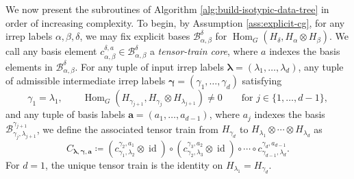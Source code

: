 \documentclass[11pt]{article}
\newcommand{\scB}{\mathcal{B}}
\newcommand{\HomG}[2]{\operatorname{Hom}_G\!\left(#1,#2\right)}
\newcommand{\id}{\operatorname{id}}
\newcommand{\set}[1]{\{#1\}}
\theoremstyle{definition}
\begin{document}
We now present the subroutines of Algorithm \ref{alg:build-isotypic-data-tree} in order of increasing complexity.
To begin, by Assumption \ref{ass:explicit-cg}, for any irrep labels $\alpha,\beta,\delta$, we may fix explicit bases $\scB_{\alpha,\beta}^{\delta}$ for $\HomG{H_\delta}{H_\alpha\otimes H_\beta}$.
We call any basis element $c_{\alpha,\beta}^{\delta,a}\in\scB_{\alpha,\beta}^{\delta}$ a \emph{tensor-train core}, where $a$ indexes the basis elements in $\scB_{\alpha,\beta}^{\delta}$.
For any tuple of input irrep labels $\boldsymbol{\lambda}=(\lambda_1,\dots,\lambda_d)$, any tuple of admissible intermediate irrep labels $\boldsymbol{\gamma}=(\gamma_1,\dots,\gamma_d)$ satisfying
\[
  \gamma_1=\lambda_1,
  \qquad
  \HomG{H_{\gamma_{j+1}}}{H_{\gamma_j}\otimes H_{\lambda_{j+1}}}\neq 0
  \qquad
  \text{for } j\in\set{1,\dots,d-1},
\]
and any tuple of basis labels $\boldsymbol{a}=(a_1,\dots,a_{d-1})$, where $a_j$ indexes the basis $\scB_{\gamma_j,\lambda_{j+1}}^{\gamma_{j+1}}$, we define the associated tensor train from $H_{\gamma_d}$ to $H_{\lambda_1}\otimes\cdots\otimes H_{\lambda_d}$ as
\begin{equation}\label{eq:general-tensor-train-map}
  C_{\boldsymbol{\lambda},\boldsymbol{\gamma},\boldsymbol{a}}
  \coloneq
  (c_{\gamma_1,\lambda_2}^{\gamma_2,a_1}\otimes \id)
  \circ
  (c_{\gamma_2,\lambda_3}^{\gamma_3,a_2}\otimes \id)
  \circ\cdots\circ
  c_{\gamma_{d-1},\lambda_d}^{\gamma_d,a_{d-1}}.
\end{equation}
For $d=1$, the unique tensor train is the identity on $H_{\lambda_1}=H_{\gamma_d}$.
\end{document}
